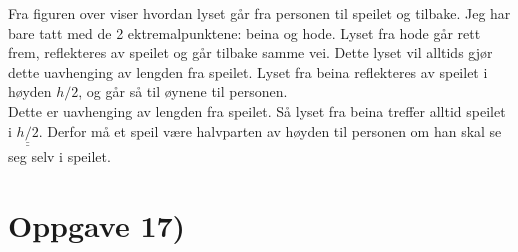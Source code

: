 \documentclass[a4paper,norsk, 10pt]{article}
\begin{document}
Fra figuren over viser hvordan lyset går fra personen til speilet og tilbake. Jeg har bare tatt med de 2 ektremalpunktene: beina og hode. Lyset fra hode går rett frem, reflekteres av speilet og går tilbake samme vei. Dette lyset vil alltids gjør dette uavhenging av lengden fra speilet. Lyset fra beina reflekteres av speilet i høyden $h/2$, og går så til øynene til personen.\\

Dette er uavhenging av lengden fra speilet. Så lyset fra beina treffer alltid speilet i $\underline{\underline{h/2}}$. Derfor må et speil være halvparten av høyden til personen om han skal se seg selv i speilet.


\section*{Oppgave 17)}
\end{document}
